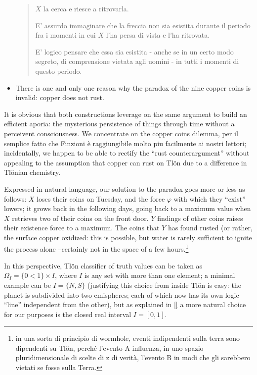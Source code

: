 \begin{example}
\begin{itemize}
\begin{quote}
    $X$ la cerca e riesce a ritrovarla.
    
    E' assurdo immaginare che la freccia non sia esistita durante il periodo fra i momenti in cui $X$ l'ha persa di vista e l'ha ritrovata.
    
    E' logico pensare che essa sia esistita - anche se in un certo modo segreto, di comprensione vietata agli uomini - in tutti i momenti di questo periodo.
\end{quote}
    \item There is one and only one reason why the paradox of the nine copper coins is invalid: copper does not rust.
  \end{itemize}
  It is obvious that both constructions leverage on the same argument to build an efficient aporia: the mysterious persistence of things through time without a perceivent consciousness. We concentrate on the copper coins dilemma, per il semplice fatto che Finzioni è raggiungibile molto piu facilmente ai nostri lettori; incidentally, we happen to be able to rectify the ``rust counterargument'' without appealing to the assumption that copper can rust on Tl\"on due to a difference in Tl\"onian chemistry.%

  Expressed in natural language, our solution to the paradox goes more or less as follows: $X$ loses their coins on Tuesday, and the force $\varphi$ with which they ``exist'' lowers; it grows back in the following days, going back to a maximum value when $X$ retrieves two of their coins on the front door. $Y$ findings of other coins raises their existence force to a maximum. The coins that $Y$ has found rusted (or rather, the surface copper oxidized: this is possible, but water is rarely sufficient to ignite the process alone --certainly not in the space of a few hours.\footnote{in una sorta di principio di wormhole, eventi indipendenti sulla terra sono dipendenti su Tlön, perché l'evento A influenza, in uno spazio pluridimensionale di scelte di z di verità, l'evento B in modi che gli sarebbero vietati se fosse sulla Terra.} 
  
  In this perspective, Tl\"on classifier of truth values can be taken as $\Omega_I = \{0<1\}\times I$, where $I$ is any set with more than one element; a minimal example can be $I=\{N,S\}$ (justifying this choice from inside Tl\"on is easy: the planet is subdivided into two emispheres; each of which now has its own logic ``line'' independent from the other), but as explained in \ref{} a more natural choice for our purposes is the closed real interval $I=[0,1]$.
  

\end{example}
